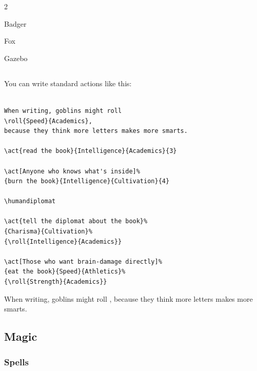 \documentclass[a4paper,openany]{book}
\begin{document}
\begin{multicols}{2}
\begin{dlist}
  \item Badger
  \item Fox
  \item Gazebo
\end{dlist}

\subsection{}

You can write standard actions like this:

\begin{verbatim}

When writing, goblins might roll
\roll{Speed}{Academics},
because they think more letters makes more smarts.

\act{read the book}{Intelligence}{Academics}{3}

\act[Anyone who knows what's inside]%
{burn the book}{Intelligence}{Cultivation}{4}

\humandiplomat

\act{tell the diplomat about the book}%
{Charisma}{Cultivation}%
{\roll{Intelligence}{Academics}}

\act[Those who want brain-damage directly]%
{eat the book}{Speed}{Athletics}%
{\roll{Strength}{Academics}}

\end{verbatim}

When writing, goblins might roll , because they think more letters makes more smarts.



\humandiplomat



\subsection{Magic}

\subsubsection{Spells}


\end{multicols}
\end{document}
